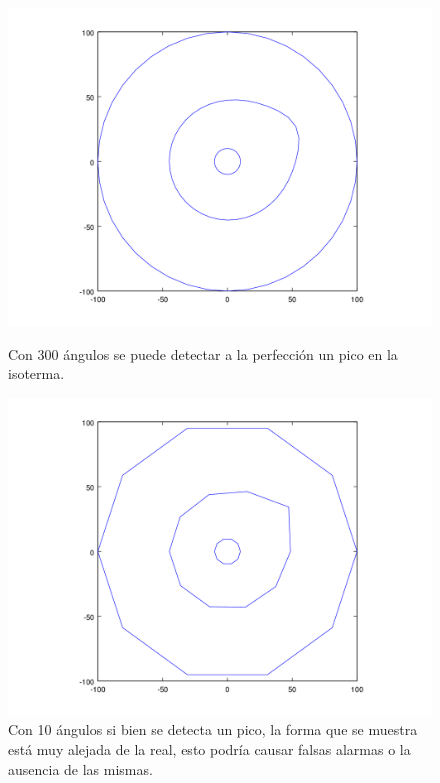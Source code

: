 \begin{figure}[H]
\centering
\begin{minipage}{0.48\textwidth}
  \centering
    \includegraphics[width=1\textwidth]{imgs/comp_angulos/comp_angs_iso0.png}
  \caption{\footnotesize{Con 300 ángulos se puede detectar a la perfección un pico en la isoterma.}}
  \label{fig:Experimento1}
\end{minipage}%
\hspace{0.03\textwidth}
\begin{minipage}{0.48\textwidth}   
  \centering
    \includegraphics[width=1\textwidth]{imgs/comp_angulos/comp_angs_iso3.png} 
  \caption{\footnotesize{Con 10 ángulos si bien se detecta un pico, la forma que se muestra está muy alejada de la real, esto podría causar falsas alarmas o la ausencia de las mismas.}}
  \label{fig:Experimento2}
\end{minipage}
\end{figure}


